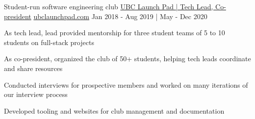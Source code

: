 \begin{cventries}

  \cventry
    {Student-run software engineering club} %
    {\href{https://bobheadxi.dev/what-is-launch-pad/}{UBC Launch Pad | Tech Lead, Co-president}} %
    {\href{https://ubclaunchpad.com}{ubclaunchpad.com}} %
    {
        Jan 2018 - Aug 2019
        | May - Dec 2020
    } %
    {
      \begin{cvitems} %
        \item {As tech lead, lead provided mentorship for three student teams of 5 to 10 students on full-stack projects}
        \item {As co-president, organized the club of 50+ students, helping tech leads coordinate and share resources}
        \item {Conducted interviews for prospective members and worked on many iterations of our interview process}
        \item {Developed tooling and websites for club management and documentation}
      \end{cvitems}
    }

\iffalse
  \cventry
    {the organization behind western Canada's largest hackathon, nwHacks} %
    {nwPlus | Web Developer} %
    {\linktext{2019.nwhacks.io}} %
    {May 2018 - Sept 2018} %
    {
      \begin{cvitems} %
        \item {Implemented the nwHacks 2019 website and applicant management system used by 1000+ users}
      \end{cvitems}
    }
\fi


\end{cventries}
